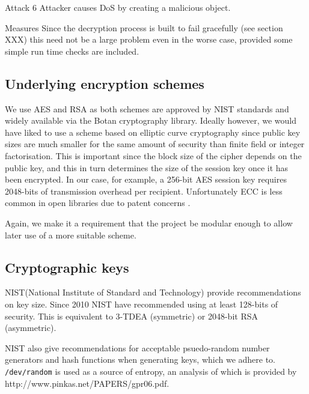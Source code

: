 \begin{sdesc} \addtolength{\itemsep}{-0.5\baselineskip}
    \item[Attack 6] Attacker causes DoS by creating a malicious object.
    \item[Measures] Since the decryption process is built to fail gracefully (see section XXX) this need not be a large problem even in the worse case, provided some simple run time checks are included.
\end{sdesc}


\FloatBarrier
\subsection{Underlying encryption schemes}

We use AES and RSA as both schemes are approved by NIST standards \cite{nist} and widely available via the Botan cryptography library. Ideally however, we would have liked to use a scheme based on elliptic curve cryptography since public key sizes are much smaller for the same amount of security than finite field or integer factorisation. This is important since the block size of the cipher depends on the public key, and this in turn determines the size of the session key once it has been encrypted. In our case, for example, a 256-bit AES session key requires 2048-bits of transmission overhead per recipient. Unfortunately ECC is less common in open libraries due to patent concerns \cite{XXX}.

Again, we make it a requirement that the project be modular enough to allow later use of a more suitable scheme.


\FloatBarrier
\subsection{Cryptographic keys}
\label{ssec:keys}

NIST(National Institute of Standard and Technology) provide recommendations on key size. Since 2010 NIST have recommended using at least 128-bits of security. This is equivalent to 3-TDEA (symmetric) or 2048-bit RSA (asymmetric). \cite{nist}

NIST also give recommendations for acceptable psuedo-random number generators and hash functions when generating keys, which we adhere to. {\tt /dev/random} is used as a source of entropy, an analysis of which is provided by http://www.pinkas.net/PAPERS/gpr06.pdf.
	
    

